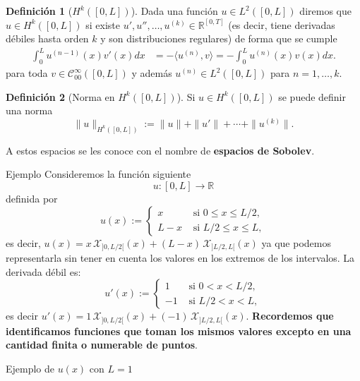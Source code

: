\documentclass[10pt,handout]{beamer}
\theoremstyle{plain} %
\theoremstyle{plain} %
\theoremstyle{plain} %
\theoremstyle{plain} %
\theoremstyle{definition}
\newtheorem{defn}{Definici\'on}
\theoremstyle{example}
\theoremstyle{example}
\theoremstyle{remark}
\theoremstyle{remark}
\begin{document}
\begin{frame}
\begin{defn}[{$H^k([0,L])$}]
Dada una función $u \in L^2([0,L])$ diremos que $u \in H^k([0,L])$  
si existe $u',u'',\ldots,u^{(k)} \in \mathbb{R}^{[0,T]}$ (es decir, tiene derivadas débiles hasta orden $k$ 
y son distribuciones regulares) de forma que se cumple
\begin{align*}
\int_0^L u^{(n-1)}(x)v'(x)dx & = - \langle u^{(n)}, v \rangle = - \int_0^L u^{(n)}(x)v(x)dx.
\end{align*}
para toda $v \in \mathcal{C}_{00}^{\infty}([0,L])$ y además $u^{(n)} \in L^2([0,L])$ para
$n=1,\ldots,k.$
\end{defn}
\begin{defn}[Norma en {$H^k([0,L])$}]
Si $u \in H^k([0,L])$ se puede definir una norma
$$
\|u\|_{H^k([0,L])}:= \|u\|+\|u'\|+\cdots+\|u^{(k)}\|.
$$
\end{defn}
A estos espacios se les conoce con el nombre de \textbf{espacios de Sobolev}.
\end{frame}

\begin{frame}{Ejemplo}
Consideremos la función siguiente
$$
u:[0,L] \longrightarrow \mathbb{R}
$$
definida por
$$
u(x):= \left\{
\begin{array}{ccc}
x & \text{ si } 0 \le x \le L/2, \\ 
L-x & \text{ si } L/2 \le x \le L,
\end{array}
\right.
$$
es decir, $u(x)=x \, \mathcal{X}_{]0,L/2[}(x)+ (L-x)\, \mathcal{X}_{]L/2,L[}(x)$ ya que podemos representarla sin tener en cuenta los valores en los extremos de los intervalos. La derivada débil es:
$$
u'(x):= \left\{
\begin{array}{rcc}
1 & \text{ si } 0  < x < L/2, \\ 
-1 & \text{ si } L/2 < x < L,
\end{array}
\right.
$$
es decir $u'(x)= 1\, \mathcal{X}_{]0,L/2[}(x)  + (-1) \, \mathcal{X}_{]L/2,L[}(x).$ \textbf{Recordemos
que identificamos funciones que toman los mismos valores excepto en una cantidad finita o numerable de puntos}.
\end{frame}

\begin{frame}{Ejemplo de $u(x)$ con $L=1$}
\end{frame}
\end{document}
